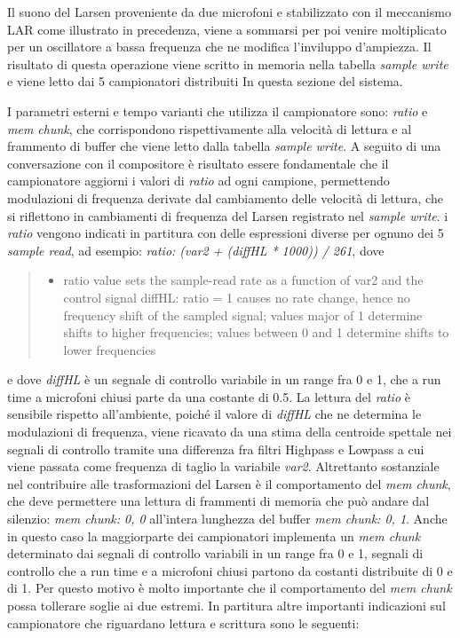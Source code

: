 Il suono del Larsen proveniente da due microfoni e stabilizzato con il meccanismo LAR come 
illustrato in precedenza, viene a sommarsi per poi venire moltiplicato per un oscillatore a bassa frequenza
che ne modifica l'inviluppo d'ampiezza. Il risultato di questa operazione viene scritto in memoria
nella tabella \textit{sample write} e viene letto dai 5 campionatori distribuiti In
questa sezione del sistema.

I parametri esterni e tempo varianti che utilizza il campionatore sono: \textit{ratio} e \textit{mem chunk},
che corrispondono rispettivamente alla velocità di lettura e al frammento di buffer che viene letto
dalla tabella \textit{sample write}.
A seguito di una conversazione con il compositore è risultato essere fondamentale che
il campionatore aggiorni i valori di \textit{ratio} ad ogni campione, permettendo modulazioni
di frequenza derivate dal cambiamento delle velocità di lettura,
che si riflettono in cambiamenti di frequenza del Larsen registrato nel \textit{sample write}.
i \textit{ratio} vengono indicati in partitura con delle espressioni diverse per ognuno
dei 5 \textit{sample read}, ad esempio: \textit{ratio: (var2 + (diffHL * 1000)) / 261}, dove 

\begin{quote}
    \begin{itemize}
      \item ratio value sets the sample-read rate as a function of var2 and the control signal diffHL: ratio = 1 causes no rate
      change, hence no frequency shift of the sampled signal; values major of 1 determine shifts to higher frequencies; values
      between 0 and 1 determine shifts to lower frequencies
    \end{itemize}
\end{quote}

e dove \textit{diffHL} è un segnale
di controllo variabile in un range fra 0 e 1, che a run time a microfoni chiusi parte da una costante di 0.5.
La lettura del \textit{ratio} è sensibile rispetto all'ambiente, poiché il valore di \textit{diffHL}
che ne determina le modulazioni di frequenza, viene ricavato da una stima della centroide spettale 
nei segnali di controllo tramite una differenza fra filtri Highpass e Lowpass 
a cui viene passata come frequenza di taglio la variabile \textit{var2}.
Altrettanto sostanziale nel contribuire alle trasformazioni del Larsen 
è il comportamento del \textit{mem chunk}, che deve permettere una lettura
di frammenti di memoria che può andare dal silenzio: \textit{mem chunk: 0, 0} all'intera
lunghezza del buffer \textit{mem chunk: 0, 1}.
Anche in questo caso la maggiorparte dei campionatori implementa un \textit{mem chunk} 
determinato dai segnali di controllo variabili in un range fra 0 e 1, 
segnali di controllo che a run time e a microfoni chiusi 
partono da costanti distribuite di 0 e di 1.
Per questo motivo è molto importante che il comportamento del \textit{mem chunk} 
possa tollerare soglie ai due estremi.
In partitura altre importanti indicazioni sul campionatore che riguardano 
lettura e scrittura sono le seguenti:

